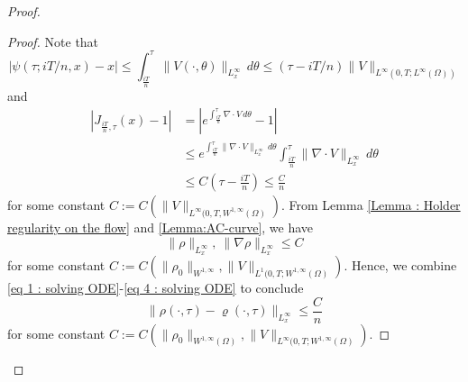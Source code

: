\documentclass{amsart}
\numberwithin{equation}{section}
\begin{document}
\begin{proof}
\begin{proof}
Note that 
\begin{equation*}\label{eq 2 : solving ODE}
|\psi(\tau; iT/n, x)-x| \leq  \int_{\frac{iT}{n}}^\tau \|V(\cdot,\theta )\|_{L^{\infty}_{x}}\,d\theta \leq (\tau-iT/n)\| V\|_{L^\infty(0,T; L^\infty(\Omega))}
\end{equation*}
  and
\begin{equation*}\label{eq 3 : solving ODE}
\begin{aligned}
\left|J_{\frac{iT}{n}, \tau}(x) -1 \right|&={\left |e^{\int^\tau_{\frac{iT}{n}} \nabla \cdot V\,d\theta}-1\right |} \\
&\leq {e^{\int^\tau_{\frac{iT}{n}} \|\nabla\cdot V\|_{L^{\infty}_{x}}\, d\theta}} \int^\tau_{\frac{iT}{n}} \|\nabla \cdot V\|_{L^{\infty}_{x}}\,d\theta\\
&\leq C \left(\tau-\frac{iT}{n}\right) \leq \frac{C}{n}
\end{aligned}
\end{equation*}
for some constant $C:=C(\|V\|_{L^\infty(0,T, W^{1,\infty}(\Omega)})$.  From Lemma \ref{Lemma : Holder regularity on the flow} and \ref{Lemma:AC-curve}, we have
\begin{equation}\label{eq 4 : solving ODE}
\|\rho\|_{L^{\infty}_{x}},~\|\nabla \rho\|_{L^{\infty}_{x}} \leq C 
\end{equation}
for some constant $C:=C(\|\rho_0\|_{W^{1,\infty}}, \|V\|_{L^1(0,T; W^{1,\infty}(\Omega)})$.  Hence, we combine \eqref{eq 1 : solving ODE}-\eqref{eq 4 : solving ODE} to conclude
\begin{equation}\label{eq 5 : solving ODE}
\|\rho(\cdot,\tau)-\varrho(\cdot,\tau)\|_{L^{\infty}_{x}} \leq  \frac{C}{n}
\end{equation}
for some constant $C:=C(\|\rho_0\|_{W^{1, \infty}(\Omega)}, \|V\|_{L^\infty (0,T; W^{1,\infty}(\Omega)})$.


\end{proof}
\end{proof}
\end{document}
